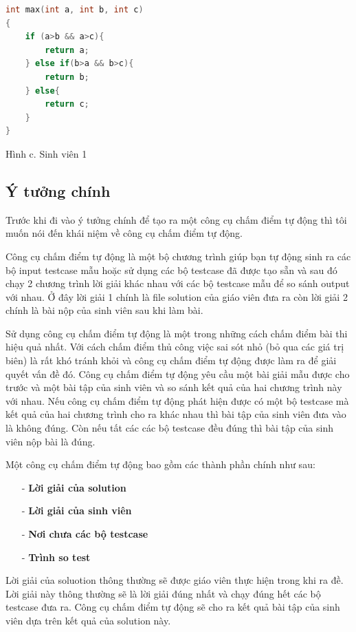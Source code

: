 \documentclass[12pt,a4paper]{article}
\begin{document}
\begin{lstlisting}[language=c]
int max(int a, int b, int c) 
{ 
    if (a>b && a>c){
        return a;
    } else if(b>a && b>c){
        return b;
    } else{
        return c;
    }
}
\end{lstlisting}
\caption{Hình c. Sinh viên 1}

\subsection{Ý tưởng chính}
Trước khi đi vào ý tưởng chính để tạo ra một công cụ chấm điểm tự động thì tôi muốn nói đến khái niệm về công cụ chấm điểm tự động.

Công cụ chấm điểm tự động là một bộ chương trình giúp bạn tự động sinh ra các bộ input testcase mẫu hoặc sử dụng các bộ testcase đã được tạo sẵn và sau đó chạy 2 chương trình lời giải khác nhau với các bộ testcase mẫu để so sánh output với nhau. Ở đây lời giải 1 chính là file solution của giáo viên đưa ra còn lời giải 2 chính là bài nộp của sinh viên sau khi làm bài.

Sử dụng công cụ chấm điểm tự động là một trong những cách chấm điểm bài thi hiệu quả nhất. Với cách chấm điểm thủ công việc sai sót nhỏ (bỏ qua các giá trị biên) là rất khó tránh khỏi và công cụ chấm điểm tự động được làm ra để giải quyết vấn đề đó. Công cụ chấm điểm tự động yêu cầu một bài giải mẫu được cho trước và một bài tập của sinh viên và so sánh kết quả của hai chương trình này với nhau. Nếu công cụ chấm điểm tự động phát hiện được có một bộ testcase mà kết quả của hai chương trình cho ra khác nhau thì bài tập của sinh viên đưa vào là không đúng. Còn nếu tất các các bộ testcase đều đúng thì bài tập của sinh viên nộp bài là đúng.

Một công cụ chấm điểm tự động bao gồm các thành phần chính như sau:
\begin{itemize}
\item[-] \textbf{Lời giải của solution}
\item[-] \textbf{Lời giải của sinh viên}
\item[-] \textbf{Nơi chưa các bộ testcase}
\item[-] \textbf{Trình so test}
\end{itemize}

Lời giải của soluotion thông thường sẽ được giáo viên thực hiện trong khi ra đề. Lời giải này thông thường sẽ là lời giải đúng nhất và chạy đúng hết các bộ testcase đưa ra. Công cụ chấm điểm tự động sẽ cho ra kết quả bài tập của sinh viên dựa trên kết quả của solution này.
\end{document}

